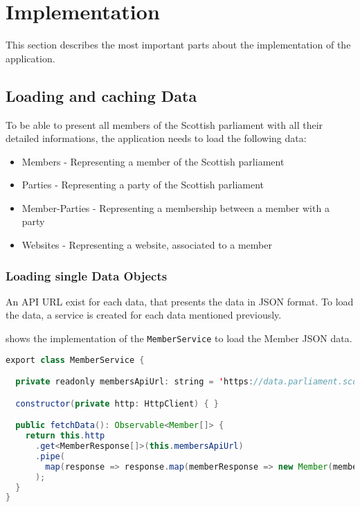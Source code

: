\section{Implementation}\label{sec:02_impl}
This section describes the most important parts about the implementation of the application.

\subsection{Loading and caching Data}\label{subsec:02_impl_data}
To be able to present all members of the Scottish parliament with all their detailed informations, the application needs to load the following data:
\begin{itemize}
\item Members - Representing a member of the Scottish parliament
\item Parties - Representing a party of the Scottish parliament
\item Member-Parties - Representing a membership between a member with a party
\item Websites - Representing a website, associated to a member
\end{itemize}


\subsubsection{Loading single Data Objects}\label{subsubsec:02_impl_data_loading}
An API URL exist for each data, that presents the data in JSON format. To load the data, a service is created for each data mentioned previously.

 shows the implementation of the \texttt{MemberService} to load the Member JSON data.
\begin{lstlisting}[label=lst:02_impl_data_memberservice, caption=\texttt{MemberService} implementation, language=java]
export class MemberService {

  private readonly membersApiUrl: string = 'https://data.parliament.scot/api/members';

  constructor(private http: HttpClient) { }

  public fetchData(): Observable<Member[]> {
    return this.http
      .get<MemberResponse[]>(this.membersApiUrl)
      .pipe(
        map(response => response.map(memberResponse => new Member(memberResponse)))
      );
  }
}
\end{lstlisting}

